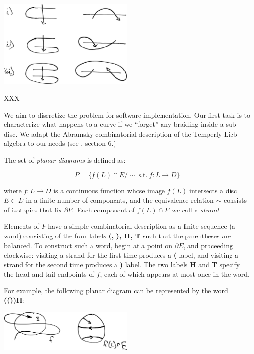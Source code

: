\documentclass[11pt,a4paper]{article}
\begin{document}
\begin{center}
\includegraphics[width=0.5\textwidth]{snake-cases.eps}
\end{center}

XXX



We aim to discretize the problem for software implementation.
Our first task is to characterize what happens to a curve
if we ``forget'' any braiding inside a sub-disc.
We adapt the Abramsky combinatorial description 
of the Temperly-Lieb algebra to our needs
(see \cite{Abramsky08}, section 6.) %

The set of {\it planar diagrams} is defined as:

    $$ P = \{ f(L)\cap E / \sim \ \text{s.t.}\ f:L\to D \}$$

where $f:L\to D$ is a continuous function 
whose image $f(L)$ intersects a disc $E\subset D$ in a finite number of components,
and the equivalence relation $\sim$ consists of 
isotopies that fix $\partial E.$ %
Each component of $f(L)\cap E$ we call a {\it strand.}

Elements of $P$ have a simple combinatorial description 
as a finite sequence (a word) consisting of
the four labels {\bf (, ), H, T} such that 
the parentheses are balanced.
To construct such a word, begin at a point on $\partial E$, and proceeding
clockwise: visiting a strand for the first time produces a {\bf ( } label,
and visiting a strand for the second time produces a {\bf ) } label.
The two labels {\bf H} and {\bf T} specify the
head and tail endpoints of $f$, each of which appears at most once in the word.

For example, the following planar diagram can be represented by
the word {\bf(())H}:

\begin{center}
\includegraphics[width=0.5\textwidth]{planar.eps}
\end{center}
\end{document}
